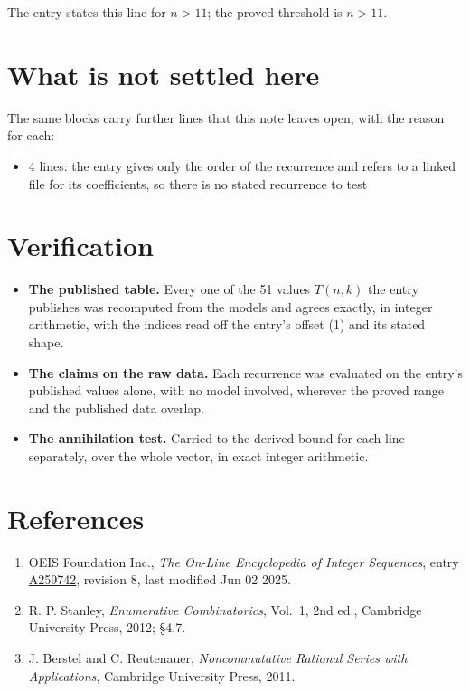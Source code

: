 \documentclass[11pt]{article}
\theoremstyle{definition}
\begin{document}
The entry states this line for $n > 11$; the proved threshold is $n > 11$.

\section{What is not settled here}

The same blocks carry further lines that this note leaves open, with the reason for each:

\begin{itemize}

\item 4 lines: the entry gives only the order of the recurrence and refers to a linked file for its coefficients, so there is no stated recurrence to test

\end{itemize}

\section{Verification}

\begin{itemize}

\item {\bfseries The published table.} Every one of the 51 values $T(n,k)$ the entry publishes was recomputed from the models and agrees exactly, in integer arithmetic, with the indices read off the entry's offset (1) and its stated shape.

\item {\bfseries The claims on the raw data.} Each recurrence was evaluated on the entry's published values alone, with no model involved, wherever the proved range and the published data overlap.

\item {\bfseries The annihilation test.} Carried to the derived bound for each line separately, over the whole vector, in exact integer arithmetic.

\end{itemize}

\section{References}

\begin{enumerate}

\item OEIS Foundation Inc., \emph{The On-Line Encyclopedia of Integer Sequences}, entry \href{https://oeis.org/A259742}{A259742}, revision 8, last modified Jun 02 2025.

\item R. P. Stanley, \emph{Enumerative Combinatorics}, Vol.~1, 2nd ed., Cambridge University Press, 2012; \S4.7.

\item J. Berstel and C. Reutenauer, \emph{Noncommutative Rational Series with Applications}, Cambridge University Press, 2011.

\end{enumerate}
\end{document}

